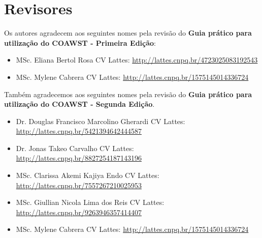 \chapter*{Revisores}

\bigskip
\noindent Os autores agradecem aos seguintes nomes pela revisão do \textbf{Guia prático para utilização do COAWST - Primeira Edição}:
\bigskip

\begin{itemize}
    \item MSc. Eliana Bertol Rosa \newline CV Lattes: \textcolor{bleu_cite}{\href{http://lattes.cnpq.br/4723025083192543}{http://lattes.cnpq.br/4723025083192543}}
    \bigskip
    \item MSc. Mylene Cabrera \newline CV Lattes: \textcolor{bleu_cite}{\href{http://lattes.cnpq.br/1575145014336724}{http://lattes.cnpq.br/1575145014336724}}
\end{itemize}

\bigskip
\bigskip
\noindent Também agradecemos aos seguintes nomes pela revisão do \textbf{Guia prático para utilização do COAWST - Segunda Edição}.
\bigskip

\begin{itemize}
    \item Dr. Douglas Francisco Marcolino Gherardi \newline CV Lattes: \textcolor{bleu_cite}{\href{http://lattes.cnpq.br/5421394642444587}{http://lattes.cnpq.br/5421394642444587}}
    \bigskip
    \item Dr. Jonas Takeo Carvalho \newline CV Lattes: \textcolor{bleu_cite}{\href{http://lattes.cnpq.br/8827254187143196}{http://lattes.cnpq.br/8827254187143196}}
    \bigskip
    \item MSc. Clarissa Akemi Kajiya Endo \newline CV Lattes: \textcolor{bleu_cite}{\href{http://lattes.cnpq.br/7557267210025953}{http://lattes.cnpq.br/7557267210025953}}
    \bigskip
    \item MSc. Giullian Nicola Lima dos Reis \newline CV Lattes: \textcolor{bleu_cite}{\href{http://lattes.cnpq.br/9263946357414407}{http://lattes.cnpq.br/9263946357414407}}
    \bigskip
    \item MSc. Mylene Cabrera \newline CV Lattes: \textcolor{bleu_cite}{\href{http://lattes.cnpq.br/1575145014336724}{http://lattes.cnpq.br/1575145014336724}}
\end{itemize}
